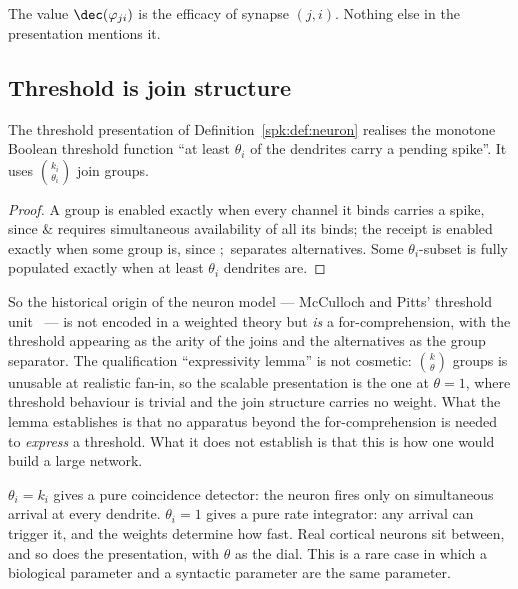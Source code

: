 The value $\dec(\varphi_{ji})$ is the efficacy of synapse $(j,i)$. Nothing else in the
presentation mentions it.

\subsection{Threshold is join structure}

\begin{proposition}
\label{spk:prop:mcp}
The threshold presentation of Definition~\ref{spk:def:neuron} realises the monotone
Boolean threshold function ``at least $\theta_i$ of the dendrites carry a pending
spike''. It uses $\binom{k_i}{\theta_i}$ join groups.
\end{proposition}

\begin{proof}
A group is enabled exactly when every channel it binds carries a spike, since $\&$
requires simultaneous availability of all its binds; the receipt is enabled exactly when
some group is, since $;$ separates alternatives. Some $\theta_i$-subset is fully
populated exactly when at least $\theta_i$ dendrites are.
\end{proof}

So the historical origin of the neuron model --- McCulloch and Pitts' threshold
unit~\cite{mcp} --- is not encoded in a weighted theory but \emph{is} a
for-comprehension, with the threshold appearing as the arity of the joins and the
alternatives as the group separator. The qualification ``expressivity lemma'' is not
cosmetic: $\binom{k}{\theta}$ groups is unusable at realistic fan-in, so the scalable
presentation is the one at $\theta = 1$, where threshold behaviour is trivial and the
join structure carries no weight. What the lemma establishes is that no apparatus beyond
the for-comprehension is needed to \emph{express} a threshold. What it does not establish
is that this is how one would build a large network.

\begin{remark}
\label{spk:rmk:dial}
$\theta_i = k_i$ gives a pure coincidence detector: the neuron fires only on simultaneous
arrival at every dendrite. $\theta_i = 1$ gives a pure rate integrator: any arrival can
trigger it, and the weights determine how fast. Real cortical neurons sit between, and so
does the presentation, with $\theta$ as the dial. This is a rare case in which a
biological parameter and a syntactic parameter are the same parameter.
\end{remark}

